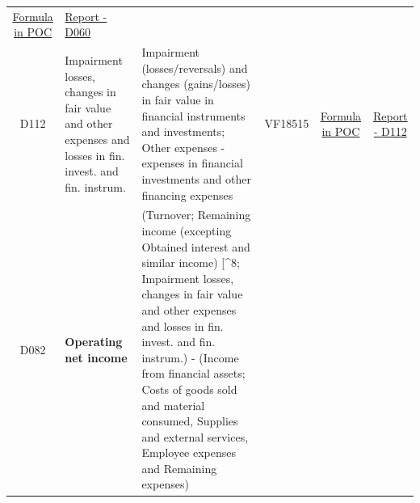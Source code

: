 \documentclass[]{book}
\begin{document}
\begin{longtable}[]{@{}cllccc@{}}
\begin{minipage}[t]{0.15\columnwidth}
\protect\hyperlink{d060---formula-in-poc}{Formula in POC}\strut
\end{minipage} & \begin{minipage}[t]{0.16\columnwidth}\centering
\href{./Auxiliary\%20Files/technical_reports/variable_report/D060.pdf}{Report - D060}\strut
\end{minipage}\tabularnewline
\begin{minipage}[t]{0.08\columnwidth}\centering
D112\strut
\end{minipage} & \begin{minipage}[t]{0.20\columnwidth}\raggedright
Impairment losses, changes in fair value and other expenses and losses in fin. invest. and fin. instrum.\strut
\end{minipage} & \begin{minipage}[t]{0.16\columnwidth}\raggedright
Impairment (losses/reversals) and changes (gains/losses) in fair value in financial instruments and investments; Other expenses - expenses in financial investments and other financing expenses\strut
\end{minipage} & \begin{minipage}[t]{0.09\columnwidth}\centering
VF18515\strut
\end{minipage} & \begin{minipage}[t]{0.15\columnwidth}\centering
\protect\hyperlink{d112---formula-in-poc}{Formula in POC}\strut
\end{minipage} & \begin{minipage}[t]{0.16\columnwidth}\centering
\href{./Auxiliary\%20Files/technical_reports/variable_report/D112(!).pdf}{Report - D112}\strut
\end{minipage}\tabularnewline
\begin{minipage}[t]{0.08\columnwidth}\centering
D082\strut
\end{minipage} & \begin{minipage}[t]{0.20\columnwidth}\raggedright
\textbf{Operating net income}\strut
\end{minipage} & \begin{minipage}[t]{0.16\columnwidth}\raggedright
(Turnover; Remaining income (excepting Obtained interest and similar income) {[}\^{}8; Impairment losses, changes in fair value and other expenses and losses in fin. invest. and fin. instrum.) - (Income from financial assets; Costs of goods sold and material consumed, Supplies and external services, Employee expenses and Remaining expenses)\strut
\end{minipage} & \begin{minipage}[t]{0.09\columnwidth}\centering

\end{minipage}
\end{longtable}
\end{document}
